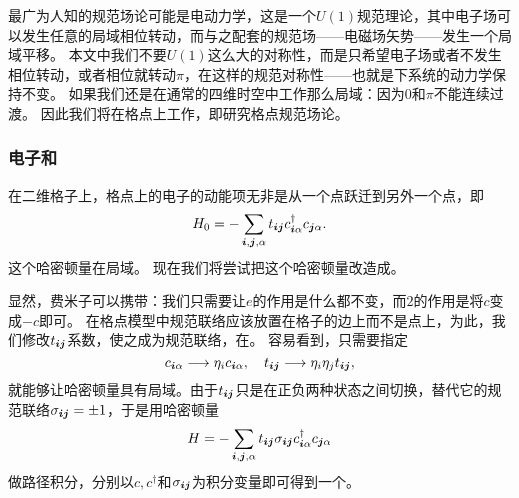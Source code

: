 最广为人知的规范场论可能是电动力学，这是一个$U(1)$规范理论，其中电子场可以发生任意的局域相位转动，而与之配套的规范场——电磁场矢势——发生一个局域平移。
本文中我们不要$U(1)$这么大的对称性，而是只希望电子场或者不发生相位转动，或者相位就转动$\pi$，在这样的规范对称性——也就是下系统的动力学保持不变。
如果我们还是在通常的四维时空中工作那么局域：因为$0$和$\pi$不能连续过渡。
因此我们将在格点上工作，即研究格点规范场论。

\subsubsection{电子和}

在二维格子上，格点上的电子的动能项无非是从一个点跃迁到另外一个点，即
\begin{equation}
    {H}_0 = - \sum_{\vb*{i}, \vb*{j}, \alpha} t_{\vb*{i} \vb*{j}} {c}_{\vb*{i} \alpha}^\dagger {c}_{\vb*{j} \alpha}.
    \label{eq:hopping-hamiltonian}
\end{equation}
这个哈密顿量在局域。
现在我们将尝试把这个哈密顿量改造成。

显然，费米子可以携带：我们只需要让$e$的作用是什么都不变，而$2$的作用是将$c$变成$-c$即可。
在格点模型中规范联络应该放置在格子的边上而不是点上，为此，我们修改$t_{\vb*{i} \vb*{j}}$系数，使之成为规范联络，在。
容易看到，只需要指定
\[
    {c}_{\vb*{i} \alpha} \longrightarrow \eta_{i} {c}_{\vb*{i} \alpha}, \quad t_{\vb*{i} \vb*{j}} \longrightarrow \eta_i \eta_j t_{\vb*{i} \vb*{j}},
\]
就能够让哈密顿量具有局域。由于$t_{\vb*{i} \vb*{j}}$只是在正负两种状态之间切换，替代它的规范联络$\sigma_{\vb*{i} \vb*{j}} = \pm 1$，于是用哈密顿量
\[
    {H} = - \sum_{\vb*{i}, \vb*{j}, \alpha} t_{\vb*{i} \vb*{j}} \sigma_{\vb*{i} \vb*{j}} {c}_{\vb*{i} \alpha}^\dagger {c}_{\vb*{j} \alpha}
\]
做路径积分，分别以${c}, {c}^\dagger$和$\sigma_{\vb*{i} \vb*{j}}$为积分变量即可得到一个。

